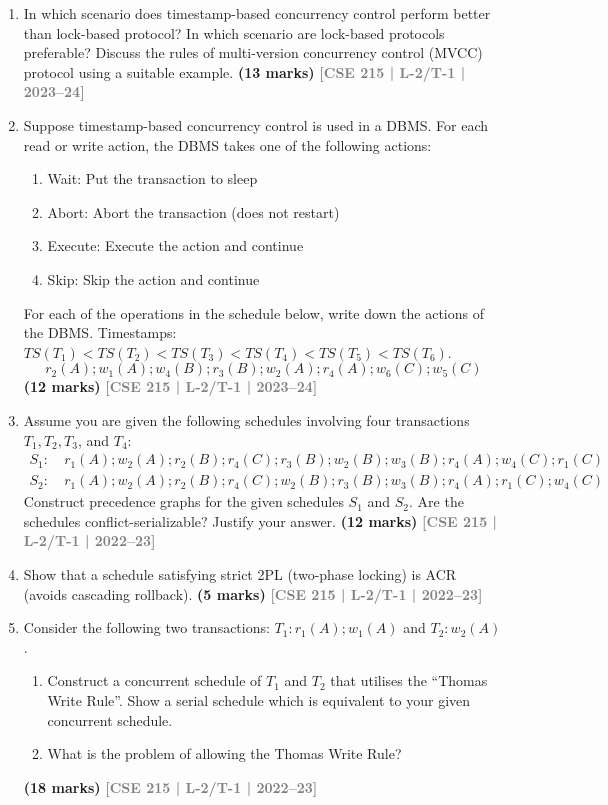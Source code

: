 \documentclass[12pt,a3paper]{article}
\newcommand{\yr}[1]{\hfill\textcolor{gray}{\small\textbf{[#1]}}}
\newcommand{\mk}[1]{\textcolor{orange!70!black}{\small\textbf{(#1 marks)}}}
\begin{document}
\begin{enumerate}
\item In which scenario does timestamp-based concurrency control perform better than lock-based protocol? In which scenario are lock-based protocols preferable? Discuss the rules of multi-version concurrency control (MVCC) protocol using a suitable example.
\mk{13} \yr{CSE 215 | L-2/T-1 | 2023--24}

\item Suppose timestamp-based concurrency control is used in a DBMS. For each read or write action, the DBMS takes one of the following actions:
\begin{enumerate}
\item Wait: Put the transaction to sleep 
\item Abort: Abort the transaction (does not restart)
\item Execute: Execute the action and continue
\item Skip: Skip the action and continue
\end{enumerate}
For each of the operations in the schedule below, write down the actions of the DBMS. Timestamps: $TS(T_1) < TS(T_2) < TS(T_3) < TS(T_4) < TS(T_5) < TS(T_6)$.
\[r_2(A); w_1(A); w_4(B); r_3(B); w_2(A); r_4(A); w_6(C); w_5(C)\]
\mk{12} \yr{CSE 215 | L-2/T-1 | 2023--24}

\item Assume you are given the following schedules involving four transactions $T_1, T_2, T_3$, and $T_4$:
\begin{align*}
S_1\colon &\ r_1(A); w_2(A); r_2(B); r_4(C); r_3(B); w_2(B); w_3(B); r_4(A); w_4(C); r_1(C)\\
S_2\colon &\ r_1(A); w_2(A); r_2(B); r_4(C); w_2(B); r_3(B); w_3(B); r_4(A); r_1(C); w_4(C)
\end{align*}
Construct precedence graphs for the given schedules $S_1$ and $S_2$. Are the schedules conflict-serializable? Justify your answer.
  \mk{12} \yr{CSE 215 | L-2/T-1 | 2022--23}

\item Show that a schedule satisfying strict 2PL (two-phase locking) is ACR (avoids cascading rollback).
\mk{5} \yr{CSE 215 | L-2/T-1 | 2022--23}

\item Consider the following two transactions: $T_1\colon r_1(A); w_1(A)$ and $T_2\colon w_2(A)$.
\begin{enumerate}
  \item Construct a concurrent schedule of $T_1$ and $T_2$ that utilises the ``Thomas Write Rule''. Show a serial schedule which is equivalent to your given concurrent schedule.
  \item What is the problem of allowing the Thomas Write Rule?
\end{enumerate}
  \mk{18} \yr{CSE 215 | L-2/T-1 | 2022--23}


\end{enumerate}
\end{document}
